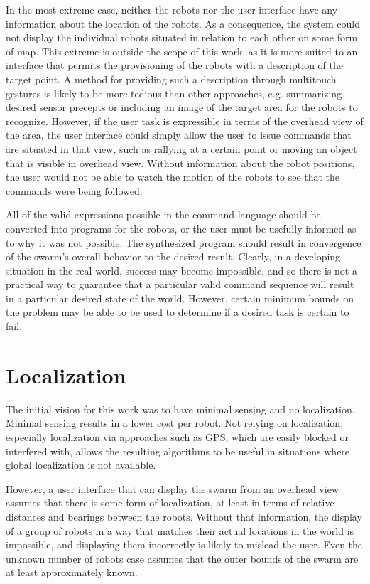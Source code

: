 In the most extreme case, neither the robots nor the user interface have any information about the location of the robots. 
As a consequence, the system could not display the individual robots situated in relation to each other on some form of map. 
This extreme is outside the scope of this work, as it is more suited to an interface that permits the provisioning of the robots with a description of the target point. 
A method for providing such a description through multitouch gestures is likely to be more tedious than other approaches, e.g. summarizing desired sensor precepts or including an image of the target area for the robots to recognize. 
However, if the user task is expressible in terms of the overhead view of the area, the user interface could simply allow the user to issue commands that are situated in that view, such as rallying at a certain point or moving an object that is visible in overhead view. 
Without information about the robot positions, the user would not be able to watch the motion of the robots to see that the commands were being followed. 

All of the valid expressions possible in the command language should be converted into programs for the robots, or the user must be usefully informed as to why it was not possible. 
The synthesized program should result in convergence of the swarm's overall behavior to the desired result. 
Clearly, in a developing situation in the real world, success may become impossible, and so there is not a practical way to guarantee that a particular valid command sequence will result in a particular desired state of the world. 
However, certain minimum bounds on the problem may be able to be used to determine if a desired task is certain to fail. 

\section{Localization}

The initial vision for this work was to have minimal sensing and no localization. 
Minimal sensing results in a lower cost per robot. 
Not relying on localization, especially localization via approaches such as GPS, which are easily blocked or interfered with, allows the resulting algorithms to be useful in situations where global localization is not available. 

However, a user interface that can display the swarm from an overhead view assumes that there is some form of localization, at least in terms of relative distances and bearings between the robots.
Without that information, the display of a group of robots in a way that matches their actual locations in the world is impossible, and displaying them incorrectly is likely to mislead the user. 
Even the unknown number of robots case assumes that the outer bounds of the swarm are at least approximately known. 

